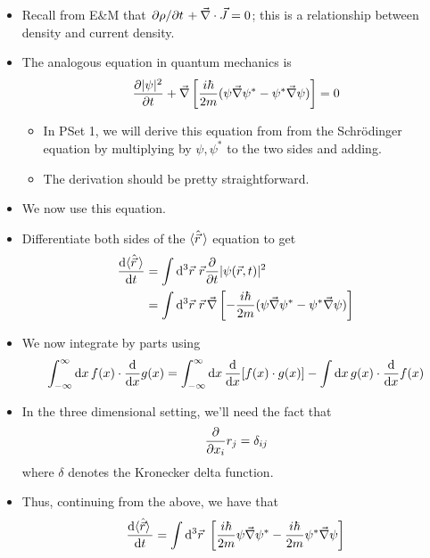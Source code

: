 \documentclass[../notes.tex]{subfiles}
\begin{document}
\begin{itemize}
\begin{itemize}
        \item Recall from E\&M that $\pdv*{\rho}{t}+\vec{\nabla}\cdot\vec{J}=0$; this is a relationship between density and current density.
        \item The analogous equation in quantum mechanics is
        \begin{equation*}
            \pdv{|\psi|^2}{t}+\vec{\nabla}\left[ \frac{i\hbar}{2m}(\psi\vec{\nabla}\psi^*-\psi^*\vec{\nabla}\psi) \right] = 0
        \end{equation*}
        \begin{itemize}
            \item In PSet 1, we will derive this equation from from the Schr\"{o}dinger equation by multiplying by $\psi,\psi^*$ to the two sides and adding.
            \item The derivation should be pretty straightforward.
        \end{itemize}
        \item We now use this equation.
        \item Differentiate both sides of the $\langle{\hat{\vec{r}}\,}\rangle$ equation to get
        \begin{align*}
            \dv{\Exp{\hat{\vec{r}}\,}}{t} &= \int\dd^3\vec{r}\ \vec{r}\pdv{t}|\psi(\vec{r},t)|^2\\
            &= \int\dd^3\vec{r}\ \vec{r}\,\vec{\nabla}\left[ -\frac{i\hbar}{2m}(\psi\vec{\nabla}\psi^*-\psi^*\vec{\nabla}\psi) \right]
        \end{align*}
        \item We now integrate by parts using
        \begin{equation*}
            \int_{-\infty}^\infty\dd{x}f(x)\cdot\dv{x}g(x) = \int_{-\infty}^\infty\dd{x}\dv{x}[f(x)\cdot g(x)]-\int\dd{x}g(x)\cdot\dv{x}f(x)
        \end{equation*}
        \item In the three dimensional setting, we'll need the fact that
        \begin{equation*}
            \pdv{x_i}r_j = \delta_{ij}
        \end{equation*}
        where $\delta$ denotes the Kronecker delta function.
        \item Thus, continuing from the above, we have that
        \begin{align*}
            \dv{\Exp{\hat{\vec{r}}}\,}{t} &= \int\dd^3\vec{r}\ \left[ \frac{i\hbar}{2m}\psi\vec{\nabla}\psi^*-\frac{i\hbar}{2m}\psi^*\vec{\nabla}\psi \right]\\

\end{align*}
\end{itemize}
\end{itemize}
\end{document}

